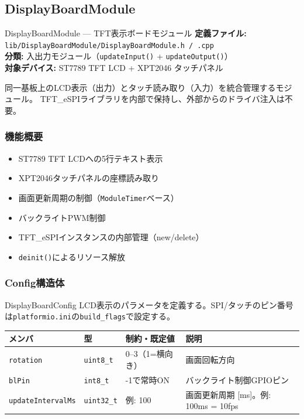 \subsection{DisplayBoardModule}

\begin{apibox}{DisplayBoardModule --- TFT表示ボードモジュール}
\textbf{定義ファイル:} \texttt{lib/DisplayBoardModule/DisplayBoardModule.h / .cpp}\\
\textbf{分類:} 入出力モジュール（\texttt{updateInput()} + \texttt{updateOutput()}）\\
\textbf{対象デバイス:} ST7789 TFT LCD + XPT2046 タッチパネル

同一基板上のLCD表示（出力）とタッチ読み取り（入力）を統合管理するモジュール。
TFT\_eSPIライブラリを内部で保持し、外部からのドライバ注入は不要。
\end{apibox}

\subsubsection{機能概要}

\begin{itemize}
    \item ST7789 TFT LCDへの5行テキスト表示
    \item XPT2046タッチパネルの座標読み取り
    \item 画面更新周期の制御（\texttt{ModuleTimer}ベース）
    \item バックライトPWM制御
    \item TFT\_eSPIインスタンスの内部管理（new/delete）
    \item \texttt{deinit()}によるリソース解放
\end{itemize}

\subsubsection{Config構造体}

\begin{funcblock}{DisplayBoardConfig}
LCD表示のパラメータを定義する。SPI/タッチのピン番号は\texttt{platformio.ini}の\texttt{build\_flags}で設定する。

\begin{longtable}{l l l p{4.5cm}}
\toprule
\textbf{メンバ} & \textbf{型} & \textbf{制約・既定値} & \textbf{説明} \\
\midrule
\endhead
\texttt{rotation}        & \texttt{uint8\_t}  & 0--3（1=横向き） & 画面回転方向 \\
\texttt{blPin}           & \texttt{int8\_t}   & -1で常時ON       & バックライト制御GPIOピン \\
\texttt{updateIntervalMs} & \texttt{uint32\_t} & 例: 100         & 画面更新周期 [ms]。例: 100ms = 10fps \\
\bottomrule
\end{longtable}
\end{funcblock}

